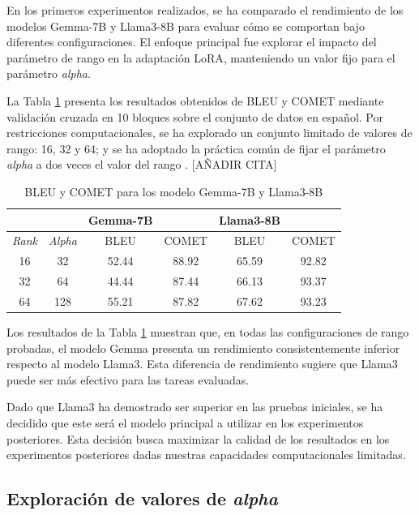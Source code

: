 \documentclass[11pt,spanish,listoffigures,listoftables]{tfgetsinf}
\begin{document}
En los primeros experimentos realizados, se ha comparado el rendimiento de los modelos Gemma-7B y Llama3-8B para evaluar cómo se comportan bajo diferentes configuraciones. El enfoque principal fue explorar el impacto del parámetro de rango en la adaptación LoRA, manteniendo un valor fijo para el parámetro \textit{alpha}.

La Tabla \ref{tab: Gemma y Llama} presenta los resultados obtenidos de BLEU y COMET mediante validación cruzada en 10 bloques sobre el conjunto de datos en español. Por restricciones computacionales, se ha explorado un conjunto limitado de valores de rango: 16, 32 y 64; y se ha adoptado la práctica común de fijar el parámetro \textit{alpha} a dos veces el valor del rango \cite{}. [AÑADIR CITA]

\begin{table}[!h]
\caption{BLEU y COMET para los modelo Gemma-7B y Llama3-8B}
\begin{center}
\begin{tabular}{ c c c c c c }
	\ & \ & Gemma-7B & \ & Llama3-8B & \ \\
	\hline
	\textit{Rank} & \textit{Alpha} & BLEU & COMET & BLEU & COMET \\
	\hline
	\hline
	16 & 32 & 52.44 & 88.92 & 65.59 & 92.82 \\
	\hline
	32 & 64 & 44.44 & 87.44 & 66.13 & 93.37 \\
	\hline
	64 & 128 & 55.21 & 87.82 & 67.62 & 93.23 \\
	

\end{tabular}
\end{center}
\label{tab: Gemma y Llama}
\end{table}

Los resultados de la Tabla \ref{tab: Gemma y Llama} muestran que, en todas las configuraciones de rango probadas, el modelo Gemma presenta un rendimiento consistentemente inferior respecto al modelo Llama3. Esta diferencia de rendimiento sugiere que Llama3 puede ser más efectivo para las tareas evaluadas.

Dado que Llama3 ha demostrado ser superior en las pruebas iniciales, se ha decidido que este será el modelo principal a utilizar en los experimentos posteriores. Esta decisión busca maximizar la calidad de los resultados en los experimentos posteriores dadas nuestras capacidades computacionales limitadas.

\subsection{Exploración de valores de \textit{alpha}}
\end{document}
